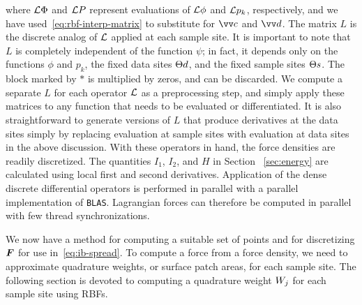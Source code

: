 where $\mathcal{L}\Phi$ and $\mathcal{L} P$ represent evaluations of $\mathcal{L}\phi$ and $\mathcal{L} p_k$, respectively,
and we have used~\eqref{eq:rbf-interp-matrix} to substitute for $\arr{c}$ and $\arr{d}$.
The matrix $L$ is the discrete analog of $\mathcal{L}$ applied at each sample site. It is
important to note that $L$ is completely independent of the function $\psi$; in fact, it
depends only on the functions $\phi$ and $p_k$, the fixed data sites $\data\sites$, and
the fixed sample sites $\sample\sites$.  The block marked by $\ast$ is multiplied by
zeros, and can be discarded. We compute a separate $L$ for each operator $\mathcal{L}$ as a
preprocessing step, and simply apply these matrices to any function that needs to be
evaluated or differentiated. It is also straightforward to generate versions of $L$ that
produce derivatives at the data sites simply by replacing evaluation at sample sites with
evaluation at data sites in the above discussion. With these operators in hand, the force
densities are readily discretized. The quantities $I_1$, $I_2$, and $H$ in Section~%
\ref{sec:energy} are calculated using local first and second derivatives. Application of
the dense discrete differential operators is performed in parallel with a parallel
implementation of \texttt{BLAS}. Lagrangian forces can therefore be computed in parallel
with few thread synchronizations.

We now have a method for computing a suitable set of points and for discretizing $\boldsymbol{F}$ for
use in~\eqref{eq:ib-spread}. To compute a force from a force density, we need to
approximate quadrature weights, or surface patch areas, for each sample site. The
following section is devoted to computing a quadrature weight $\weight[j]$ for each
sample site using RBFs.

